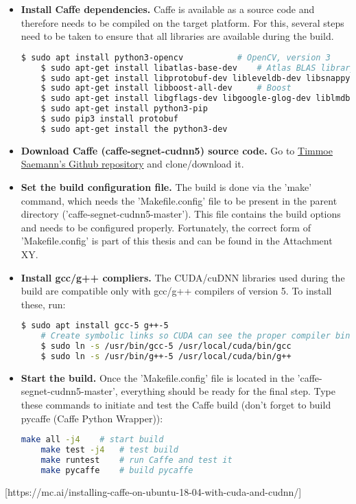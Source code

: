 \begin{itemize}
		
	\item \textbf{Install Caffe dependencies.} Caffe is available as a source code and therefore needs to be compiled on the target platform. For this, several steps need to be taken to ensure that all libraries are available during the build. 
	
	\begin{lstlisting}[language=bash]
	$ sudo apt install python3-opencv 			# OpenCV, version 3
	$ sudo apt-get install libatlas-base-dev 	# Atlas BLAS library
	$ sudo apt-get install libprotobuf-dev libleveldb-dev libsnappy-dev libopencv-dev libhdf5-serial-dev protobuf-compiler
	$ sudo apt-get install libboost-all-dev		# Boost
	$ sudo apt-get install libgflags-dev libgoogle-glog-dev liblmdb-dev
	$ sudo apt-get install python3-pip
	$ sudo pip3 install protobuf
	$ sudo apt-get install the python3-dev
	\end{lstlisting}
	
	\item \textbf{Download Caffe (caffe-segnet-cudnn5) source code.} Go to \href{https://github.com/TimoSaemann/caffe-segnet-cudnn5}{Timmoe Saemann's Github repository} and clone/download it. 
	\item \textbf{Set the build configuration file.} The build is done via the 'make' command, which needs the 'Makefile.config' file to be present in the parent directory ('caffe-segnet-cudnn5-master'). This file contains the build options and needs to be configured properly. Fortunately, the correct form of 'Makefile.config' is part of this thesis and can be found in the Attachment XY. 
	
	\item \textbf{Install gcc/g++ compliers.} The CUDA/cuDNN libraries used during the build are compatible only with gcc/g++ compilers of version 5. To install these, run:
	
	\begin{lstlisting}[language=bash]
	$ sudo apt install gcc-5 g++-5
	# Create symbolic links so CUDA can see the proper compiler binaries
	$ sudo ln -s /usr/bin/gcc-5 /usr/local/cuda/bin/gcc
	$ sudo ln -s /usr/bin/g++-5 /usr/local/cuda/bin/g++
	\end{lstlisting}
	
	\item \textbf{Start the build.} Once the 'Makefile.config' file is located in the 'caffe-segnet-cudnn5-master', everything should be ready for the final step. Type these commands to initiate and test the Caffe build (don't forget to build pycaffe (Caffe Python Wrapper)):
	
	\begin{lstlisting}[language=bash]
	make all -j4	# start build
	make test -j4	# test build
	make runtest	# run Caffe and test it
	make pycaffe	# build pycaffe 
	\end{lstlisting} 	
\end{itemize}
[https://mc.ai/installing-caffe-on-ubuntu-18-04-with-cuda-and-cudnn/]

